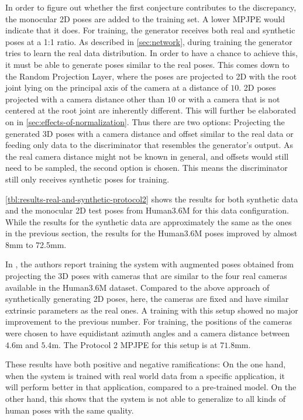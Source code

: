In order to figure out whether the first conjecture contributes to the discrepancy, the monocular 2D poses are added to the training set.
A lower MPJPE would indicate that it does.
For training, the generator receives both real and synthetic poses at a 1:1 ratio.
As described in \autoref{sec:network}, during training the generator tries to learn the real data distribution.
In order to have a chance to achieve this, it must be able to generate poses similar to the real poses. 
This comes down to the Random Projection Layer, where the poses are projected to 2D with the root joint lying on the principal axis of the camera at a distance of $10$.
2D poses projected with a camera distance other than $10$ or with a camera that is not centered at the root joint are inherently different.
This will further be elaborated on in \autoref{sec:effects-of-normalization}.
Thus there are two options:
Projecting the generated 3D poses with a camera distance and offset similar to the real data or feeding only data to the discriminator that resembles the generator's output.
As the real camera distance might not be known in general, and offsets would still need to be sampled, the second option is chosen.
This means the discriminator still only receives synthetic poses for training.



\autoref{tbl:results-real-and-synthetic-protocol2} shows the results for both synthetic data and the monocular 2D test poses from Human3.6M for this data configuration.
While the results for the synthetic data are approximately the same as the ones in the previous section, the results for the Human3.6M poses improved by almost 8mm to 72.5mm.

In \cite{drover18}, the authors report training the system with augmented poses obtained from projecting the 3D poses with cameras that are similar to the four real cameras available in the Human3.6M dataset.
Compared to the above approach of synthetically generating 2D poses, here, the cameras are fixed and have similar extrinsic parameters as the real ones.
A training with this setup showed no major improvement to the previous number.
For training, the positions of the cameras were chosen to have equidistant azimuth angles and a camera distance between $4.6$m and $5.4$m.
The Protocol 2 MPJPE for this setup is at $71.8$mm.

These results have both positive and negative ramifications:
On the one hand, when the system is trained with real world data from a specific application, it will perform better in that application, compared to a pre-trained model.
On the other hand, this shows that the system is not able to generalize to all kinds of human poses with the same quality. 
